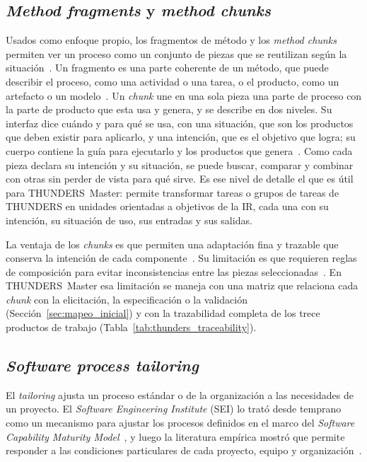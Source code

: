 \documentclass[12pt,letterpaper,oneside]{report}
\begin{document}
\subsection{\textit{Method fragments} y \textit{method chunks}}
Usados como enfoque propio, los fragmentos de método y los \textit{method chunks}
permiten ver un proceso como un conjunto de piezas que se reutilizan según la
situación~\cite{harmsen1995,ralyte2001assembly}. Un fragmento es una parte
coherente de un método, que puede describir el proceso, como una actividad o una
tarea, o el producto, como un artefacto o un modelo~\cite{harmsen1995}. Un
\textit{chunk} une en una sola pieza una parte de proceso con la parte de
producto que esta usa y genera, y se describe en dos niveles. Su interfaz dice
cuándo y para qué se usa, con una situación, que son los productos que deben
existir para aplicarlo, y una intención, que es el objetivo que logra; su cuerpo
contiene la guía para ejecutarlo y los productos que
genera~\cite{ralyte2001assembly,mirbel2006sme}. Como cada pieza declara su
intención y su situación, se puede buscar, comparar y combinar con otras sin
perder de vista para qué sirve. Es ese nivel de detalle el que es útil para THUNDERS~Master: permite transformar tareas o grupos de tareas de
THUNDERS en unidades orientadas a objetivos de la IR, cada una con su intención,
su situación de uso, sus entradas y sus salidas.

La ventaja de los \textit{chunks} es que permiten una adaptación fina y
trazable que conserva la intención de cada componente~\cite{mirbel2006sme}. Su
limitación es que requieren reglas de composición para evitar inconsistencias
entre las piezas seleccionadas~\cite{ralyte2001assembly}. En THUNDERS~Master esa
limitación se maneja con una matriz que relaciona cada \textit{chunk} con la
elicitación, la especificación o la validación (Sección~\ref{sec:mapeo_inicial}) y con
la trazabilidad completa de los trece productos de trabajo
(Tabla~\ref{tab:thunders_traceability}).

\subsection{\textit{Software process tailoring}}
El \textit{tailoring} ajusta un proceso estándar o de la organización a las
necesidades de un proyecto. El \textit{Software Engineering Institute} (SEI) lo trató desde temprano como un
mecanismo para ajustar los procesos definidos en el marco del \textit{Software
Capability Maturity Model}~\cite{ginsberg1995}, y luego la literatura empírica mostró que
permite responder a las condiciones particulares de cada proyecto, equipo y
organización~\cite{xu2007}.
\end{document}
